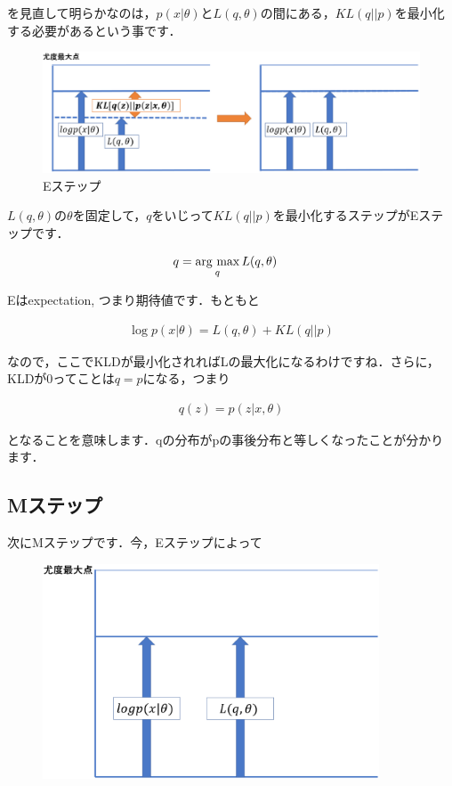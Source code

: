 \documentclass[11pt,a4paper,dvipdfmx]{ujreport}
\newcommand{\argmax}{\mathop{\rm arg~max}\limits}
\begin{document}
を見直して明らかなのは，$p(x|\theta)$と$L(q,\theta)$の間にある，$KL(q||p)$を最小化する必要があるという事です．

\begin{figure}[H]
  \label{im:em2}
  \centering
  \includegraphics[width=15cm]{../figures/em2.eps}
  \caption{Eステップ}
\end{figure}

$L(q,\theta)$の$\theta$を固定して，$q$をいじって$KL(q||p)$を最小化するステップがEステップです．

\begin{align}
  q &= \argmax_{q}L(q,\theta)
\end{align}

Eはexpectation, つまり期待値です．もともと

\begin{align}
  \log p(x|\theta) = L(q,\theta) + KL(q||p)\nonumber
\end{align}

なので，ここでKLDが最小化されればLの最大化になるわけですね．さらに，KLDが0ってことは$q=p$になる，つまり

\begin{align}
  \label{eq:e-step}
  q(z) = p(z|x,\theta)\nonumber
\end{align}

となることを意味します．qの分布がpの事後分布と等しくなったことが分かります．\\

\subsection{Mステップ}
次にMステップです．今，Eステップによって


\begin{figure}[H]
  \centering
  \includegraphics[width=10cm]{../figures/em3.eps}
\end{figure}
\end{document}

